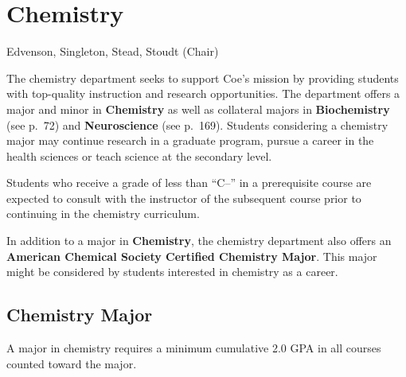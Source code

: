 \documentclass[
  letterpaper,
]{scrbook}
\begin{document}
\section{Chemistry}\label{chemistry}

Edvenson, Singleton, Stead, Stoudt (Chair)

The chemistry department seeks to support Coe's mission by providing
students with top-quality instruction and research opportunities. The
department offers a major and minor in \textbf{Chemistry} as well as
collateral majors in \textbf{Biochemistry} (see p.~72) and
\textbf{Neuroscience} (see p.~169). Students considering a chemistry
major may continue research in a graduate program, pursue a career in
the health sciences or teach science at the secondary level.

Students who receive a grade of less than ``C--'' in a prerequisite
course are expected to consult with the instructor of the subsequent
course prior to continuing in the chemistry curriculum.

In addition to a major in \textbf{Chemistry}, the chemistry department
also offers an \textbf{American Chemical Society Certified Chemistry
Major}. This major might be considered by students interested in
chemistry as a career.

\subsection{Chemistry Major}\label{chemistry-major}

A major in chemistry requires a minimum cumulative 2.0 GPA in all
courses counted toward the major.
\end{document}
